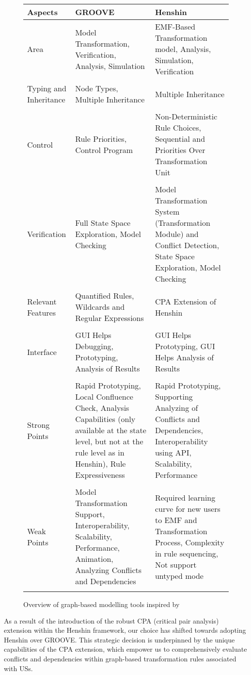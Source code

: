 \begin{figure}
\begingroup
\footnotesize
\centering
\begin{tabularx}{\textwidth}{l  X  X}
\hline
Aspects&	GROOVE	&Henshin\\
\hline\hline
Area	&Model Transformation, Verification, Analysis, Simulation	&EMF-Based Transformation model, Analysis, Simulation, Verification \\ \\ 
Typing and Inheritance&	Node Types, Multiple Inheritance	&Multiple Inheritance\\\\ 
Control&	Rule Priorities, Control Program	&Non-Deterministic Rule Choices, Sequential and Priorities Over Transformation Unit \\\\ 
Verification&	 Full State Space Exploration, Model Checking	&Model Transformation System (Transformation Module) and Conflict Detection, State Space Exploration, Model Checking\\\\ 
Relevant Features&	Quantified Rules, Wildcards and Regular Expressions	&CPA Extension of Henshin\\\\ 
Interface&	GUI Helps Debugging, Prototyping, Analysis of Results	&GUI Helps Prototyping, GUI Helps Analysis of Results\\\\ 
Strong Points&	Rapid Prototyping, Local Conﬂuence Check, Analysis Capabilities (only available at the state level, but not at the rule level as in Henshin), Rule Expressiveness	&Rapid Prototyping, Supporting Analyzing of Conflicts and Dependencies, Interoperability using API, Scalability, Performance\\\\ 
Weak Points&	Model Transformation Support, Interoperability, Scalability, Performance, Animation, Analyzing Conflicts and Dependencies 	&Required learning curve for new users to EMF and Transformation Process, Complexity in rule sequencing, Not support untyped mode\\\\ 
\hline

\end{tabularx}
\begin{TableCaption}
\caption{Overview of graph-based modelling tools inspired by \cite{ghamarian2012modelling}}\label{tb:sec_6_comparative_analysis_final}
\end{TableCaption}
\endgroup
\end{figure}
As a result of the introduction of the robust CPA (critical pair analysis) extension within the Henshin framework, our choice has shifted towards adopting Henshin over GROOVE. This strategic decision is underpinned by the unique capabilities of the CPA extension, which empower us to comprehensively evaluate conflicts and dependencies within graph-based transformation rules associated with USs. 

